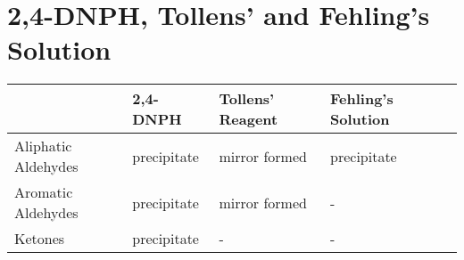 



	\pagebreak
	\section{2,4-DNPH, Tollens' and Fehling's Solution}

		\vspace{1em}
		\begin{center}
		\begin{longtabu} to \textwidth {| X[c,m] | X[c,m] | X[c,m] | X[c,m] | N}

		\hline
							&	2,4-DNPH	&	Tollens' Reagent	&	Fehling's Solution	&\\[8mm]\hline

		Aliphatic Aldehydes	&	 precipitate	&	 mirror formed	&	 precipitate
		&\\[12mm] \hline

		Aromatic Aldehydes	&	 precipitate	&	 mirror formed	&	-
		&\\[12mm] \hline

		Ketones				&	 precipitate	&	-	&	-
		&\\[12mm] \hline

		\end{longtabu}
		\end{center}



































